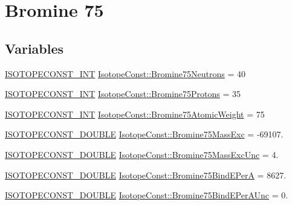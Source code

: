 \hypertarget{group___isotope_const-_bromine-_br75}{}\section{Bromine 75}
\label{group___isotope_const-_bromine-_br75}
\subsection*{Variables}
\begin{DoxyCompactItemize}
\item 
\mbox{\hyperlink{group___isotope_const-_macros_ga5f18360b3e99483a35c32d789e62621c}{I\+S\+O\+T\+O\+P\+E\+C\+O\+N\+S\+T\+\_\+\+I\+NT}} \mbox{\hyperlink{group___isotope_const-_bromine-_br75_ga919b891365963533a22ca8ce1e4ba65b}{Isotope\+Const\+::\+Bromine75\+Neutrons}} = 40
\item 
\mbox{\hyperlink{group___isotope_const-_macros_ga5f18360b3e99483a35c32d789e62621c}{I\+S\+O\+T\+O\+P\+E\+C\+O\+N\+S\+T\+\_\+\+I\+NT}} \mbox{\hyperlink{group___isotope_const-_bromine-_br75_gab4985b1b07d74e9dd8f71e790533d675}{Isotope\+Const\+::\+Bromine75\+Protons}} = 35
\item 
\mbox{\hyperlink{group___isotope_const-_macros_ga5f18360b3e99483a35c32d789e62621c}{I\+S\+O\+T\+O\+P\+E\+C\+O\+N\+S\+T\+\_\+\+I\+NT}} \mbox{\hyperlink{group___isotope_const-_bromine-_br75_ga9b7f3f2c4716a8525a1509d402de6d97}{Isotope\+Const\+::\+Bromine75\+Atomic\+Weight}} = 75
\item 
\mbox{\hyperlink{group___isotope_const-_macros_ga8f45a7272ce02c0b4c65c44636ed719a}{I\+S\+O\+T\+O\+P\+E\+C\+O\+N\+S\+T\+\_\+\+D\+O\+U\+B\+LE}} \mbox{\hyperlink{group___isotope_const-_bromine-_br75_gaf373b4ed31677d8b96d79d021f2b7c47}{Isotope\+Const\+::\+Bromine75\+Mass\+Exc}} = -\/69107.
\item 
\mbox{\hyperlink{group___isotope_const-_macros_ga8f45a7272ce02c0b4c65c44636ed719a}{I\+S\+O\+T\+O\+P\+E\+C\+O\+N\+S\+T\+\_\+\+D\+O\+U\+B\+LE}} \mbox{\hyperlink{group___isotope_const-_bromine-_br75_gac30f45c55819f6bddd2bf3967a82015f}{Isotope\+Const\+::\+Bromine75\+Mass\+Exc\+Unc}} = 4.
\item 
\mbox{\hyperlink{group___isotope_const-_macros_ga8f45a7272ce02c0b4c65c44636ed719a}{I\+S\+O\+T\+O\+P\+E\+C\+O\+N\+S\+T\+\_\+\+D\+O\+U\+B\+LE}} \mbox{\hyperlink{group___isotope_const-_bromine-_br75_gadf76570549860cd3d67086f8ffa4568a}{Isotope\+Const\+::\+Bromine75\+Bind\+E\+PerA}} = 8627.
\item 
\mbox{\hyperlink{group___isotope_const-_macros_ga8f45a7272ce02c0b4c65c44636ed719a}{I\+S\+O\+T\+O\+P\+E\+C\+O\+N\+S\+T\+\_\+\+D\+O\+U\+B\+LE}} \mbox{\hyperlink{group___isotope_const-_bromine-_br75_gac5f120793e187fd0c07dd7a274d31552}{Isotope\+Const\+::\+Bromine75\+Bind\+E\+Per\+A\+Unc}} = 0.

\end{DoxyCompactItemize}
